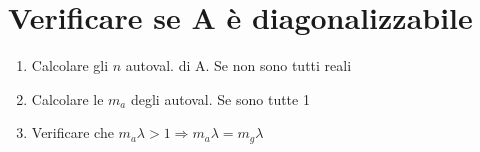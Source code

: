 \section{Verificare se A è diagonalizzabile}
\begin{enumerate}[noitemsep]
	\item Calcolare gli $n$ autoval. di A. Se non sono tutti reali \xmark
	\item Calcolare le $m_a$ degli autoval. Se sono tutte 1 \cmark
	\item Verificare che $m_a \lambda > 1 \Rightarrow m_a \lambda = m_g \lambda$ \cmark
\end{enumerate}
